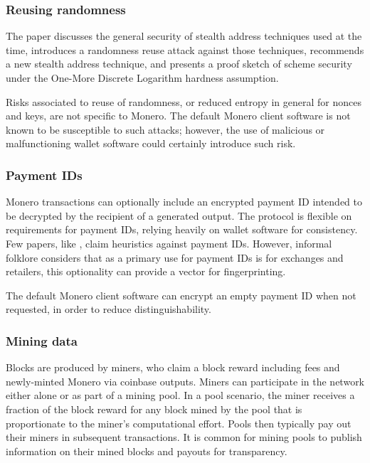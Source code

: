 \documentclass{article}
\theoremstyle{definition}
\begin{document}
\subsubsection{Reusing randomness}

The paper \cite{courtois2017stealth} discusses the general security of stealth address techniques used at the time, introduces a randomness reuse attack against those techniques, recommends a new stealth address technique, and presents a proof sketch of scheme security under the One-More Discrete Logarithm hardness assumption.

Risks associated to reuse of randomness, or reduced entropy in general for nonces and keys, are not specific to Monero.
The default Monero client software is not known to be susceptible to such attacks; however, the use of malicious or malfunctioning wallet software could certainly introduce such risk.


\subsubsection{Payment IDs}

Monero transactions can optionally include an encrypted payment ID intended to be decrypted by the recipient of a generated output.
The protocol is flexible on requirements for payment IDs, relying heavily on wallet software for consistency.
Few papers, like \cite{wijaya2019anonymity}, claim heuristics against payment IDs.
However, informal folklore considers that as a primary use for payment IDs is for exchanges and retailers, this optionality can provide a vector for fingerprinting.

The default Monero client software can encrypt an empty payment ID when not requested, in order to reduce distinguishability.


\subsubsection{Mining data}

Blocks are produced by miners, who claim a block reward including fees and newly-minted Monero via coinbase outputs.
Miners can participate in the network either alone or as part of a mining pool.
In a pool scenario, the miner receives a fraction of the block reward for any block mined by the pool that is proportionate to the miner's computational effort.
Pools then typically pay out their miners in subsequent transactions.
It is common for mining pools to publish information on their mined blocks and payouts for transparency.
\end{document}
